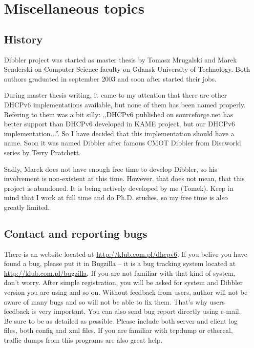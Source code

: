 
\section{Miscellaneous topics}

\subsection{History}
Dibbler project was started as master thesis by Tomasz Mrugalski and
Marek Senderski on Computer Science faculty on Gdansk University of
Technology. Both authors graduated in september 2003 and soon after
started their jobs. 

During master thesis writing, it came to my attention that there are
other DHCPv6 implementations available, but none of them has been
named properly. Refering to them was a bit
silly: ,,DHCPv6 published on sourceforge.net has better support than
DHCPv6 developed in KAME project, but our DHCPv6
implementation...''. So I have decided that this implementation should
have a name. Soon it was named Dibbler after famous CMOT
Dibbler from Discworld series by Terry Pratchett.

Sadly, Marek does not have enough free time to develop Dibbler, so his
involvement is non-existent at this time. However, that does not mean,
that this project is abandoned. It is being actively developed by
me (Tomek). Keep in mind that I work at full time and do
Ph.D. studies, so my free time is also greatly limited.

\hypertarget{contact}{}
\subsection{Contact and reporting bugs}
\label{contact}
There is an website located at \url{http://klub.com.pl/dhcpv6}. If
you belive you have found a bug, please put it in Bugzilla -- it is a
bug tracking system located at \url{http://klub.com.pl/bugzilla}. If
you are not familiar with that kind of system, don't worry. After
simple registration, you will be asked for system and Dibbler version
you are using and so on. Without feedback from users, author will not
be aware of many bugs and so will not be able to fix them. That's why
users feedback is very important. You can also send bug report
directly using e-mail. Be sure to be as detailed as possible. Please
include both server and client log files, both config and xml
files. If you are familiar with tcpdump or ethereal, traffic dumps
from this programs are also great help.

